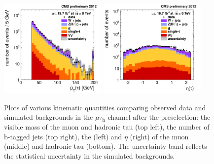 \documentclass[12pt]{thesis}  %
\newcommand{\tauh}{\ensuremath{\tau_{\text{h}}}\xspace}
\newcommand{\mutau}{\ensuremath{\mu\tauh}\xspace}
\begin{document}
\begin{figure}[hbtp]
\begin{center}
    \includegraphics[width=0.465\textwidth]{figures/mutau/preselection/pttau.pdf}
    \includegraphics[width=0.465\textwidth]{figures/mutau/preselection/etatau.pdf}
    \caption{Plots of various kinematic quantities comparing observed data and simulated backgrounds in the \mutau channel after the preselection: the visible mass of the muon and hadronic tau (top left), the number of b-tagged jets (top right), the \pt (left) and $\eta$ (right) of the muon (middle) and hadronic tau (bottom). The uncertainty band reflects the statistical uncertainty in the simulated backgrounds.}
    \label{fig:preselmutau}
  \end{center}
\end{figure}
\end{document}
